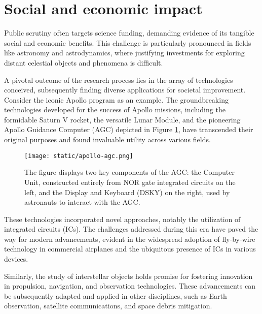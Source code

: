 \section{Social and economic impact}

Public scrutiny often targets science funding, demanding evidence of its
tangible social and economic benefits. This challenge is particularly pronounced
in fields like astronomy and astrodynamics, where justifying investments for
exploring distant celestial objects and phenomena is difficult.

A pivotal outcome of the research process lies in the array of technologies
conceived, subsequently finding diverse applications for societal improvement.
Consider the iconic Apollo program as an example. The groundbreaking
technologies developed for the success of Apollo missions, including the
formidable Saturn V rocket, the versatile Lunar Module, and the pioneering
Apollo Guidance Computer (AGC) depicted in Figure \ref{fig:apollo-agc}, have
transcended their original purposes and found invaluable utility across various
fields.

\begin{figure}[H]
  \centering
  \texttt{[image: static/apollo-agc.png]}
  \caption[Apollo Guidance Computer]{
    The figure displays two key components of the AGC: the Computer Unit,
    constructed entirely from NOR gate integrated circuits on the left, and
    the Display and Keyboard (DSKY) on the right, used by astronauts to
    interact with the AGC.
  }
  \label{fig:apollo-agc}
\end{figure}

These technologies incorporated novel approaches, notably the utilization of
integrated circuits (ICs). The challenges addressed during this era have paved
the way for modern advancements, evident in the widespread adoption of
fly-by-wire technology in commercial airplanes and the ubiquitous presence of
ICs in various devices.

Similarly, the study of interstellar objects holds promise for fostering
innovation in propulsion, navigation, and observation technologies. These
advancements can be subsequently adapted and applied in other disciplines, such
as Earth observation, satellite communications, and space debris mitigation.

